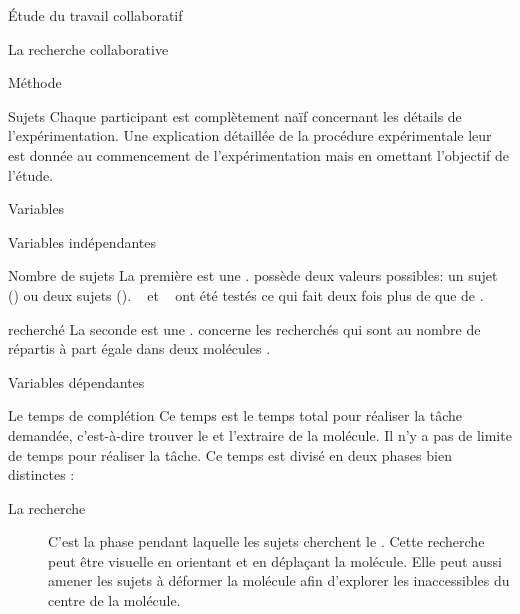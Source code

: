 \documentclass[myfrancais]{mythesis}
\begin{document}
\begin{mypart}{Étude du travail collaboratif}
\begin{mychapter}{La recherche collaborative}
\begin{mysection}{Méthode}
\begin{mysubsection}{Sujets}
					Chaque participant est complètement naïf concernant les détails de l'expérimentation.
					Une explication détaillée de la procédure expérimentale leur est donnée au commencement de l'expérimentation mais en omettant l'objectif de l'étude.
				\end{mysubsection}
				\begin{mysubsection}{Variables}
					\begin{mysubsubsection}{Variables indépendantes}
						\begin{myparagraph}{ Nombre de sujets}
							La première  est une .
							 possède deux valeurs possibles: \og un sujet \fg (\mycf {}) ou \og deux sujets \fg (\mycf {}).
							~ et ~ ont été testés ce qui fait deux fois plus de  que de .
						\end{myparagraph}
						\begin{myparagraph}{  recherché}
							La seconde  est une .
							 concerne les  recherchés qui sont au nombre de  répartis à part égale dans deux molécules .
						\end{myparagraph}
					\end{mysubsubsection}
					\begin{mysubsubsection}{Variables dépendantes}
						\begin{myparagraph}{ Le temps de complétion}
							Ce temps est le temps total pour réaliser la tâche demandée, c'est-à-dire trouver le  et l'extraire de la molécule.
							Il n'y a pas de limite de temps pour réaliser la tâche.
							Ce temps est divisé en deux phases bien distinctes :
							\begin{description}
								\item[La recherche] C'est la phase pendant laquelle les sujets cherchent le .
									Cette recherche peut être visuelle en orientant et en déplaçant la molécule.
									Elle peut aussi amener les sujets à déformer la molécule afin d'explorer les  inaccessibles du centre de la molécule.

\end{description}
\end{myparagraph}
\end{mysubsubsection}
\end{mysubsection}
\end{mysection}
\end{mychapter}
\end{mypart}
\end{document}
